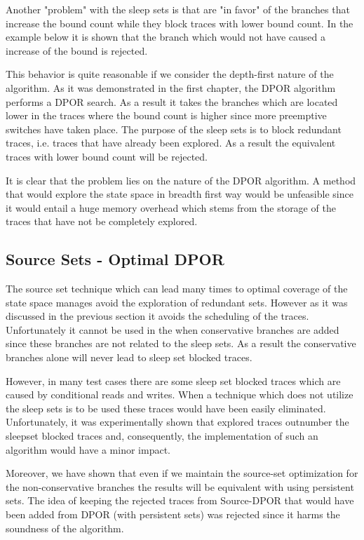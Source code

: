 Another "problem" with the sleep sets is that are "in favor" of the branches that increase the bound count while they block traces with lower bound count.
In the example below it is shown that the branch which would not have caused a increase of the bound is rejected.


This behavior is quite reasonable if we consider the depth-first nature of the algorithm. As it was demonstrated in the first chapter, the DPOR algorithm performs a DPOR search. As a result
it takes the branches which are located lower in the traces where the bound count is higher since more preemptive switches have taken place. The purpose of the sleep sets is to block redundant traces, i.e. traces that have already been
explored. As a result the equivalent traces with lower bound count will be rejected.

It is clear that the problem lies on the nature of the DPOR algorithm. A method that would explore the state space in breadth first way would be unfeasible since it would
entail a huge memory overhead which stems from the storage of the traces that have not be completely explored. 

\subsection{Source Sets - Optimal DPOR}
The source set technique which can lead many times to optimal coverage of the state space manages avoid the exploration of redundant sets. However as it was discussed
in the previous section it avoids the scheduling of the traces. Unfortunately it cannot be used in the when conservative branches are added since these branches are not
related to the sleep sets. As a result the conservative branches alone will never lead to sleep set blocked traces.

However, in many test cases there are some sleep set blocked traces which are caused by conditional reads and writes. When a technique which does not utilize 
the sleep sets is to be used these traces would have been easily eliminated. Unfortunately, it was experimentally shown that explored traces outnumber the sleepset blocked
traces and, consequently, the implementation of such an algorithm would have a minor impact.

Moreover, we have shown that even if we maintain the source-set optimization for the non-conservative branches the results will be equivalent with using
persistent sets. 
The idea of keeping the rejected traces from Source-DPOR that would have been added from DPOR (with persistent sets) was rejected since it harms
the soundness of the algorithm.

